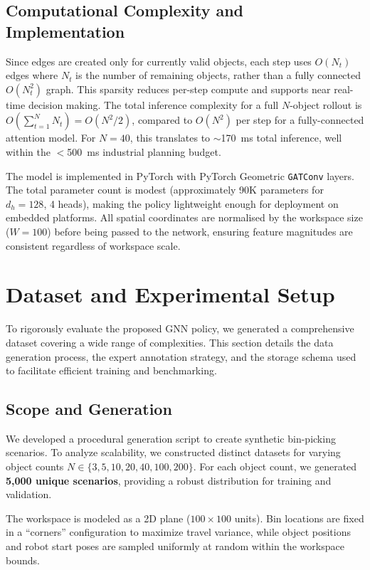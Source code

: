\documentclass[conference]{IEEEtran}
\begin{document}
\subsection{Computational Complexity and Implementation}
Since edges are created only for currently valid objects, each step uses $O(N_t)$ edges where $N_t$ is the number of remaining objects, rather than a fully connected $O(N_t^2)$ graph.
This sparsity reduces per-step compute and supports near real-time decision making. The total inference complexity for a full $N$-object rollout is $O(\sum_{t=1}^{N} N_t) = O(N^2/2)$, compared to $O(N^2)$ per step for a fully-connected attention model. For $N=40$, this translates to $\sim$170~ms total inference, well within the $<$500~ms industrial planning budget.

The model is implemented in PyTorch with PyTorch Geometric \texttt{GATConv} layers. The total parameter count is modest (approximately 90K parameters for $d_h{=}128$, 4 heads), making the policy lightweight enough for deployment on embedded platforms. All spatial coordinates are normalised by the workspace size ($W{=}100$) before being passed to the network, ensuring feature magnitudes are consistent regardless of workspace scale.

\section{Dataset and Experimental Setup}\label{sec:data}

To rigorously evaluate the proposed GNN policy, we generated a comprehensive dataset covering a wide range of complexities. This section details the data generation process, the expert annotation strategy, and the storage schema used to facilitate efficient training and benchmarking.

\subsection{Scope and Generation}
We developed a procedural generation script to create synthetic bin-picking scenarios. To analyze scalability, we constructed distinct datasets for varying object counts $N \in \{3, 5, 10, 20, 40, 100, 200\}$. For each object count, we generated \textbf{5,000 unique scenarios}, providing a robust distribution for training and validation.

The workspace is modeled as a 2D plane ($100 \times 100$ units). Bin locations are fixed in a ``corners'' configuration to maximize travel variance, while object positions and robot start poses are sampled uniformly at random within the workspace bounds.
\end{document}

